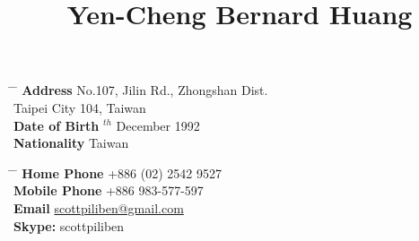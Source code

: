 \documentclass[10pt]{article} %
\begin{document}

\title{Yen-Cheng Bernard Huang} %


\parbox{0.5\textwidth}{ %
\begin{tabbing} %
\hspace{3cm} \= \hspace{4cm} \= \kill %
{\bf Address} \> No.107, Jilin Rd., Zhongshan Dist.\\ %
\> Taipei City 104, Taiwan \\ %
{\bf Date of Birth} $^{th}$ December 1992 \\ %
{\bf Nationality} \> Taiwan %
\end{tabbing}}
\hfill %
\parbox{0.5\textwidth}{ %
\begin{tabbing} %
\hspace{3cm} \= \hspace{4cm} \= \kill %
{\bf Home Phone} \> +886 (02) 2542 9527 \\ %
{\bf Mobile Phone} \> +886  983-577-597 \\ %
{\bf Email} \> \href{mailto:scottpiliben@gmail.com}{scottpiliben@gmail.com} \\ %
{\bf Skype:} \> scottpiliben
\end{tabbing}}



\end{document}
